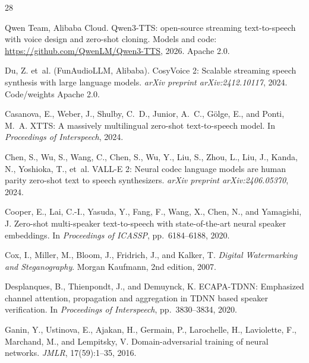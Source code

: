 \documentclass[11pt,a4paper]{article}
\begin{document}
\begin{thebibliography}{28}

Qwen Team, Alibaba Cloud.
\newblock Qwen3-TTS: open-source streaming text-to-speech with voice design and zero-shot cloning.
\newblock Models and code: \url{https://github.com/QwenLM/Qwen3-TTS}, 2026. Apache 2.0.

Du, Z. et~al. (FunAudioLLM, Alibaba).
\newblock CosyVoice 2: Scalable streaming speech synthesis with large language models.
\newblock \emph{arXiv preprint arXiv:2412.10117}, 2024. Code/weights Apache 2.0.

Casanova, E., Weber, J., Shulby, C.~D., Junior, A.~C., G{\"o}lge, E., and Ponti, M.~A.
\newblock XTTS: A massively multilingual zero-shot text-to-speech model.
\newblock In \emph{Proceedings of Interspeech}, 2024.

Chen, S., Wu, S., Wang, C., Chen, S., Wu, Y., Liu, S., Zhou, L., Liu, J., Kanda, N., Yoshioka, T., et~al.
\newblock VALL-E 2: Neural codec language models are human parity zero-shot text to speech synthesizers.
\newblock \emph{arXiv preprint arXiv:2406.05370}, 2024.

Cooper, E., Lai, C.-I., Yasuda, Y., Fang, F., Wang, X., Chen, N., and Yamagishi, J.
\newblock Zero-shot multi-speaker text-to-speech with state-of-the-art neural speaker embeddings.
\newblock In \emph{Proceedings of ICASSP}, pp.\ 6184--6188, 2020.

Cox, I., Miller, M., Bloom, J., Fridrich, J., and Kalker, T.
\newblock \emph{Digital Watermarking and Steganography}.
\newblock Morgan Kaufmann, 2nd edition, 2007.

Desplanques, B., Thienpondt, J., and Demuynck, K.
\newblock ECAPA-TDNN: Emphasized channel attention, propagation and aggregation in TDNN based speaker verification.
\newblock In \emph{Proceedings of Interspeech}, pp.\ 3830--3834, 2020.

Ganin, Y., Ustinova, E., Ajakan, H., Germain, P., Larochelle, H., Laviolette, F., Marchand, M., and Lempitsky, V.
\newblock Domain-adversarial training of neural networks.
\newblock \emph{JMLR}, 17(59):1--35, 2016.


\end{thebibliography}
\end{document}
